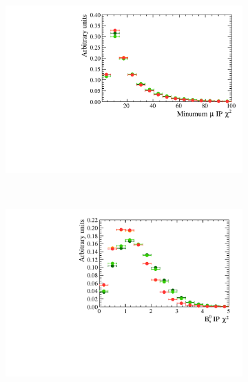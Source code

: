 \begin{figure}
 \begin{subfigure}[b]{0.48\textwidth}
        \includegraphics[width=\textwidth]{./Figs/Appendix1/signal_muIPS.pdf}
    \end{subfigure}
    ~ %
    \begin{subfigure}[b]{0.48\textwidth}
       \includegraphics[width=\textwidth]{./Figs/Appendix1/signal_IPS.pdf}
    \end{subfigure}






\end{figure}
